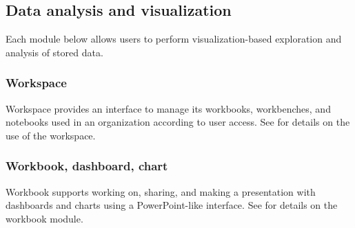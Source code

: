 \documentclass[letterpaper,10pt,english]{sphinxmanual}
\begin{document}
\subsection{Data analysis and visualization}
\label{\detokenize{discovery/part01/structure:id3}}
Each module below allows users to perform visualization-based exploration and analysis of stored data.


\subsubsection{Workspace}
\label{\detokenize{discovery/part01/structure:id4}}
Workspace provides an interface to manage its workbooks, workbenches, and notebooks used in an organization according to user access. See {\hyperref[\detokenize{discovery/part03/index::doc}]{}} for details on the use of the workspace.
\begin{quote}

\begin{figure}[H]
\centering

\noindent{}
\end{figure}
\end{quote}


\subsubsection{Workbook, dashboard, chart}
\label{\detokenize{discovery/part01/structure:id5}}
Workbook supports working on, sharing, and making a presentation with dashboards and charts using a PowerPoint-like interface. See {\hyperref[\detokenize{discovery/part04/index::doc}]{}} for details on the workbook module.
\begin{quote}

\begin{figure}[H]
\centering

\noindent{}
\end{figure}

\begin{figure}[H]
\centering

\noindent{}
\end{figure}

\begin{figure}[H]
\centering

\noindent{}
\end{figure}
\end{quote}
\end{document}
